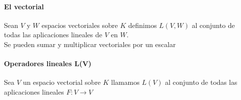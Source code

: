 \documentclass[10pt]{article}
\begin{document}
\paragraph{El vectorial} Sean $V$ y $W$ espacios vectoriales sobre $K$ definimos $L(V,W)$ al conjunto de todas las aplicaciones lineales de $V$ en $W$.\\
Se pueden sumar y multiplicar vectoriales por un escalar

\paragraph{Operadores lineales L(V)} Sea $V$ un espacio vectorial sobre $K$ llamamos $L(V)$ al conjunto de todas las aplicaciones lineales $F:V \rightarrow V$
\end{document}
